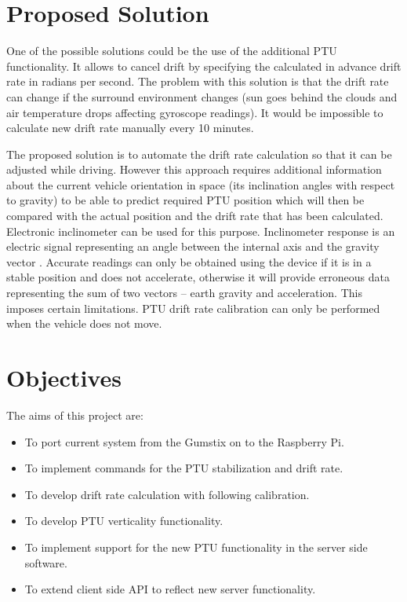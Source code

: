 \section{Proposed Solution}
One of the possible solutions could be the use of the additional PTU functionality. It allows to cancel drift by specifying the calculated in advance drift rate in radians per second. The problem with this solution is that the drift rate can change if the surround environment changes (sun goes behind the clouds and air temperature drops affecting gyroscope readings). It would be impossible to calculate new drift rate manually every 10 minutes.

The proposed solution is to automate the drift rate calculation so that it can be adjusted while driving. However this approach requires additional information about the current vehicle orientation in space (its inclination angles with respect to gravity) to be able to predict required PTU position which will then be compared with the actual position and the drift rate that has been calculated. Electronic inclinometer can be used for this purpose. Inclinometer response is an electric signal representing an angle between the internal axis and the gravity vector \cite{HandbookOfModernSensors}. Accurate readings can only be obtained using the device if it is in a stable position and does not accelerate, otherwise it will provide erroneous data representing the sum of two vectors – earth gravity and acceleration. This imposes certain limitations. PTU drift rate calibration can only be performed when the vehicle does not move.

\section{Objectives}

The aims of this project are:
\begin{itemize}
\item To port current system from the Gumstix on to the Raspberry Pi.
\item To implement commands for the PTU stabilization and drift rate.
\item To develop drift rate calculation with following calibration.
\item To develop PTU verticality functionality.
\item To implement support for the new PTU functionality in the server side software.
\item To extend client side API to reflect new server functionality.
\end{itemize}

